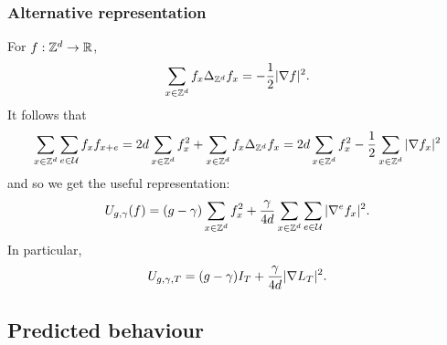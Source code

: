 \subsubsection{Alternative representation}

For $f : { {{\mathbb Z}}^d } \rightarrow {\mathbb R}$,
\begin{equation}
\label{e:sbp}
\sum_{x\in{ {{\mathbb Z}}^d }}   f_x \Delta_{{ {{\mathbb Z}}^d }} f_x
=
-\frac{1}{2} |\nabla f|^2.
\end{equation}
It follows that
\begin{equation}
\sum_{x\in{ {{\mathbb Z}}^d }} \sum_{e\in\mathcal{U}} f_x f_{x+e}
=
2 d \sum_{x\in{ {{\mathbb Z}}^d }} f_x^2
+ \sum_{x\in{ {{\mathbb Z}}^d }} f_x \Delta_{{ {{\mathbb Z}}^d }} f_x
=
2 d \sum_{x\in{ {{\mathbb Z}}^d }} f_x^2
- \frac{1}{2} \sum_{x\in{ {{\mathbb Z}}^d }} |\nabla f_x|^2
\end{equation}
and so we get the useful representation:
\begin{equation}
\label{e:Udef-pos}
U_{g,\gamma}(f)
= (g - \gamma) \sum_{x\in{ {{\mathbb Z}}^d }} f_x^2
+ \frac{\gamma}{4d} \sum_{x\in{ {{\mathbb Z}}^d }} \sum_{e\in\mathcal{U}} |\nabla^e f_x|^2.
\end{equation}
In particular,
\begin{equation}
  \label{e:V2}
  U_{g,\gamma,T} =
  (g - \gamma) I_T
  + \frac{\gamma}{4d}
  |\nabla L_T|^2
  .
\end{equation}


\subsection{Predicted behaviour}




